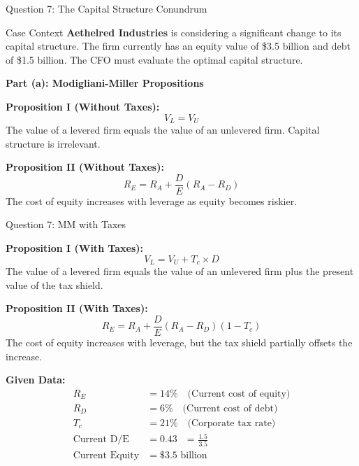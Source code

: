 \documentclass[aspectratio=169]{beamer}
\newcommand{\question}[1]{{\large\bfseries\color{crimson}#1}}
\begin{document}
	\begin{frame}{Question 7: The Capital Structure Conundrum}
		\begin{block}{Case Context}
			\textbf{Aethelred Industries} is considering a significant change to its capital structure. The firm currently has an equity value of \$3.5 billion and debt of \$1.5 billion. The CFO must evaluate the optimal capital structure.
		\end{block}
		
		\question{Part (a): Modigliani-Miller Propositions}
		
		\textbf{Proposition I (Without Taxes):}
		\[
		V_L = V_U
		\]
		The value of a levered firm equals the value of an unlevered firm. Capital structure is irrelevant.
		
		\textbf{Proposition II (Without Taxes):}
		\[
		R_E = R_A + \frac{D}{E}(R_A - R_D)
		\]
		The cost of equity increases with leverage as equity becomes riskier.
	\end{frame}
	
	\begin{frame}{Question 7: MM with Taxes}
		
		\textbf{Proposition I (With Taxes):}
		\[
		V_L = V_U + T_c \times D
		\]
		The value of a levered firm equals the value of an unlevered firm plus the present value of the tax shield.
		
		\textbf{Proposition II (With Taxes):}
		\[
		R_E = R_A + \frac{D}{E}(R_A - R_D)(1 - T_c)
		\]
		The cost of equity increases with leverage, but the tax shield partially offsets the increase.
		
		\textbf{Given Data:}
		\begin{align*}
			R_E &= 14\% \quad \text{(Current cost of equity)} \\
			R_D &= 6\% \quad \text{(Current cost of debt)} \\
			T_c &= 21\% \quad \text{(Corporate tax rate)} \\
			\text{Current D/E} &= 0.43 \quad \text{= } \frac{1.5}{3.5} \\
			\text{Current Equity} &= \$3.5 \text{ billion}
		\end{align*}
	\end{frame}
	
\end{document}
